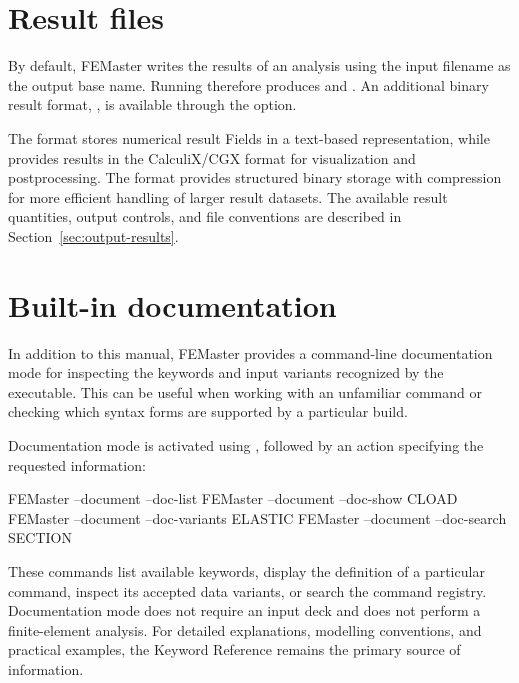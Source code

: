 \section{Result files}

By default, FEMaster writes the results of an analysis using the
input filename as the output base name. Running 
therefore produces  and .
An additional binary result format, , is available
through the  option.

The  format stores numerical result Fields in a
text-based representation, while  provides results in
the CalculiX/CGX format for visualization and postprocessing.
The  format provides structured binary storage with
compression for more efficient handling of larger result datasets.
The available result quantities, output controls, and file
conventions are described in Section~\ref{sec:output-results}.


\section{Built-in documentation}

In addition to this manual, FEMaster provides a command-line
documentation mode for inspecting the keywords and input
variants recognized by the executable. This can be useful when
working with an unfamiliar command or checking which syntax
forms are supported by a particular build.

Documentation mode is activated using , followed
by an action specifying the requested information:

\begin{shellcmd}
FEMaster --document --doc-list
FEMaster --document --doc-show CLOAD
FEMaster --document --doc-variants ELASTIC
FEMaster --document --doc-search SECTION
\end{shellcmd}

These commands list available keywords, display the definition
of a particular command, inspect its accepted data variants,
or search the command registry. Documentation mode does not
require an input deck and does not perform a finite-element
analysis. For detailed explanations, modelling conventions,
and practical examples, the Keyword Reference remains the
primary source of information.
